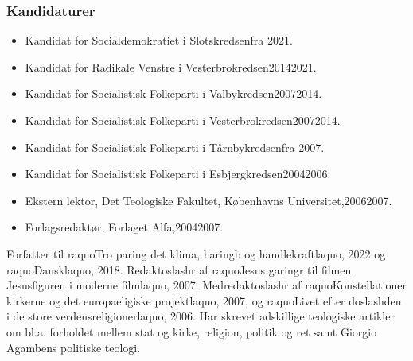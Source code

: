 \documentclass[11pt, a4paper]{awesome-cv}
\begin{document}
\begin{cvletter}
\subsubsection*{Kandidaturer}
\begin{itemize}
\item Kandidat for Socialdemokratiet i Slotskredsenfra 2021.
\item Kandidat for Radikale Venstre i Vesterbrokredsen20142021.
\item Kandidat for Socialistisk Folkeparti i Valbykredsen20072014.
\item Kandidat for Socialistisk Folkeparti i Vesterbrokredsen20072014.
\item Kandidat for Socialistisk Folkeparti i Tårnbykredsenfra 2007.
\item Kandidat for Socialistisk Folkeparti i Esbjergkredsen20042006.
\end{itemize}
\begin{itemize}
\item Ekstern lektor, Det Teologiske Fakultet, Københavns Universitet,20062007.
\item Forlagsredaktør, Forlaget Alfa,20042007.
\end{itemize}
Forfatter til raquoTro paring det  klima, haringb og handlekraftlaquo, 2022 og raquoDansklaquo, 2018. Redaktoslashr af raquoJesus garingr til filmen  Jesusfiguren i moderne filmlaquo, 2007. Medredaktoslashr af raquoKonstellationer  kirkerne og det europaeligiske projektlaquo, 2007, og raquoLivet efter doslashden  i de store verdensreligionerlaquo, 2006. Har skrevet adskillige teologiske artikler om bl.a. forholdet mellem stat og kirke, religion, politik og ret samt Giorgio Agambens politiske teologi.

\end{cvletter}
\end{document}
